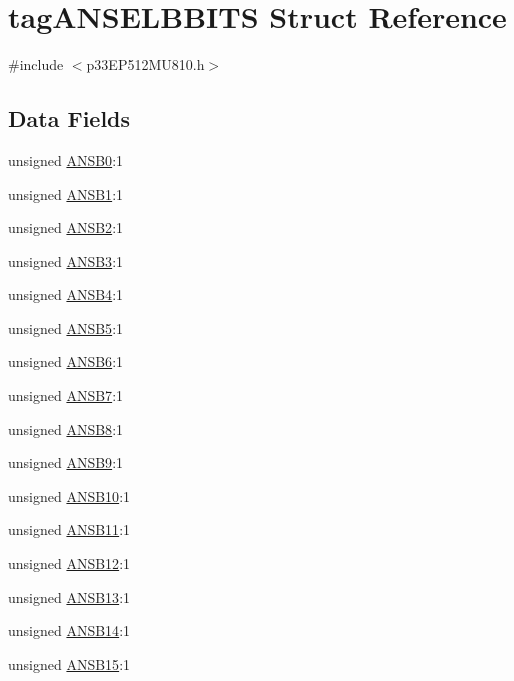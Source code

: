 \hypertarget{structtag_a_n_s_e_l_b_b_i_t_s}{}\section{tag\+A\+N\+S\+E\+L\+B\+B\+I\+TS Struct Reference}
\label{structtag_a_n_s_e_l_b_b_i_t_s}


{\ttfamily \#include $<$p33\+E\+P512\+M\+U810.\+h$>$}

\subsection*{Data Fields}
\begin{DoxyCompactItemize}
\item 
unsigned \hyperlink{structtag_a_n_s_e_l_b_b_i_t_s_ae672cb7ae3220a2ca6e84f5478e80e68}{A\+N\+S\+B0}\+:1
\item 
unsigned \hyperlink{structtag_a_n_s_e_l_b_b_i_t_s_af383a4e758605814f6d289f20ff7c60f}{A\+N\+S\+B1}\+:1
\item 
unsigned \hyperlink{structtag_a_n_s_e_l_b_b_i_t_s_a519cfae70503c72afcbaec859f06910c}{A\+N\+S\+B2}\+:1
\item 
unsigned \hyperlink{structtag_a_n_s_e_l_b_b_i_t_s_a925c3689cbb2c3674f17aec58b378b9a}{A\+N\+S\+B3}\+:1
\item 
unsigned \hyperlink{structtag_a_n_s_e_l_b_b_i_t_s_a8c7d0a10a6bf2c7cfc7a35ffb3cdcba1}{A\+N\+S\+B4}\+:1
\item 
unsigned \hyperlink{structtag_a_n_s_e_l_b_b_i_t_s_acfe3ee9ed0f24985f4a0d1c9eeb63aa0}{A\+N\+S\+B5}\+:1
\item 
unsigned \hyperlink{structtag_a_n_s_e_l_b_b_i_t_s_a400beee2a823c7f54f4f3b8c3b8107cb}{A\+N\+S\+B6}\+:1
\item 
unsigned \hyperlink{structtag_a_n_s_e_l_b_b_i_t_s_a8082741d05885cd0f1a92564b08a8263}{A\+N\+S\+B7}\+:1
\item 
unsigned \hyperlink{structtag_a_n_s_e_l_b_b_i_t_s_a517be6a4d6a2726f93c5577d22243fbd}{A\+N\+S\+B8}\+:1
\item 
unsigned \hyperlink{structtag_a_n_s_e_l_b_b_i_t_s_ac9fc58d029b3a833191ee783bf9773a6}{A\+N\+S\+B9}\+:1
\item 
unsigned \hyperlink{structtag_a_n_s_e_l_b_b_i_t_s_aaaf03a2aeb3289133e8d0039d7bf0573}{A\+N\+S\+B10}\+:1
\item 
unsigned \hyperlink{structtag_a_n_s_e_l_b_b_i_t_s_a7c7942ab40f29e28132eaf539e7e6be3}{A\+N\+S\+B11}\+:1
\item 
unsigned \hyperlink{structtag_a_n_s_e_l_b_b_i_t_s_aa93541eff991f7c05261637e0ab3d591}{A\+N\+S\+B12}\+:1
\item 
unsigned \hyperlink{structtag_a_n_s_e_l_b_b_i_t_s_af7f9cf31107f3bd88065370088ba8115}{A\+N\+S\+B13}\+:1
\item 
unsigned \hyperlink{structtag_a_n_s_e_l_b_b_i_t_s_a9b3434e6770d84e0238c10ba435deed2}{A\+N\+S\+B14}\+:1
\item 
unsigned \hyperlink{structtag_a_n_s_e_l_b_b_i_t_s_ac3f3039372e6dfd574f3034b2d7de804}{A\+N\+S\+B15}\+:1
\end{DoxyCompactItemize}


